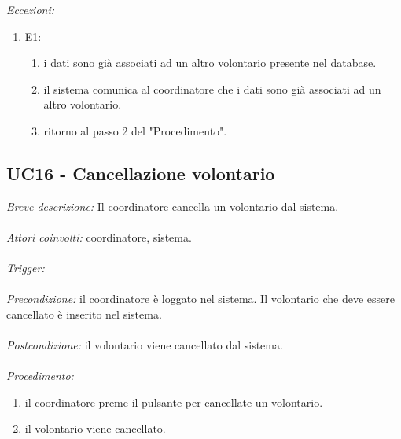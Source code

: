 \textit{Eccezioni:}
\begin{enumerate}
	\item E1:
	\begin{enumerate}
		\item i dati sono già associati ad un altro volontario presente nel database.
		\item il sistema comunica al coordinatore che i dati sono già associati ad un altro volontario.
		\item ritorno al passo 2 del "Procedimento".
	\end{enumerate}
\end{enumerate}

\subsection{UC16 - Cancellazione volontario}
\textit{Breve descrizione:} Il coordinatore cancella un volontario dal sistema. 
\\
\\
\textit{Attori coinvolti:} coordinatore, sistema.
\\
\\
\textit{Trigger:}
\\
\\
\textit{Precondizione:} il coordinatore è loggato nel sistema.
Il volontario che deve essere cancellato è inserito nel sistema.
\\
\\
\textit{Postcondizione:} il volontario viene cancellato dal sistema.
\\
\\
\textit{Procedimento:}
\begin{enumerate}
	\item il coordinatore preme il pulsante per cancellate un volontario.
	\item il volontario viene cancellato.
\end{enumerate}


